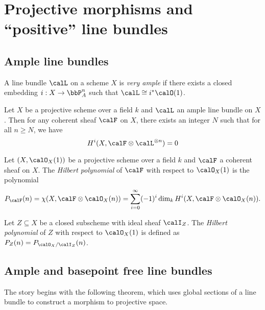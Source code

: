 \section{Projective morphisms and ``positive'' line bundles}


\subsection{Ample line bundles}

    \begin{definition}\label{def:very_ample_line_bundle}
        A line bundle \(\calL\) on a scheme \(X\) is \emph{very ample} if there exists a closed embedding \(i:X\to \bbP^n_A\) such that \(\calL\cong i^*\calO(1)\).
    \end{definition}

    \begin{theorem}\label{thm:Serre_vanishing}
        Let \(X\) be a projective scheme over a field \(k\) and \(\calL\) an ample line bundle on \(X\). 
        Then for any coherent sheaf \(\calF\) on \(X\), there exists an integer \(N\) such that for all \(n \geq N\), we have
        \[ H^i(X, \calF \otimes \calL^{\otimes n}) = 0 \]
    \end{theorem}

    \begin{definition}\label{def:Hilbert_polynomial_w.r.t_ample_line_bundles}
        Let \((X,\calO_X(1))\) be a projective scheme over a field \(k\) and \(\calF\) a coherent sheaf on \(X\).
        The \emph{Hilbert polynomial} of \(\calF\) with respect to \(\calO_X(1)\) is the polynomial 
        \[
            P_{\calF}(n) = \chi(X, \calF \otimes \calO_X(n)) = \sum_{i=0}^{\infty} (-1)^i \dim_k H^i(X, \calF \otimes \calO_X(n)).
        \]

        Let \(Z \subseteq X\) be a closed subscheme with ideal sheaf \(\calI_Z\).
        The \emph{Hilbert polynomial} of \(Z\) with respect to \(\calO_X(1)\) is defined as \(P_Z(n) = P_{\calO_X/\calI_Z}(n)\).
    \end{definition}

\subsection{Ample and basepoint free line bundles}

    The story begins with the following theorem, which uses global sections of a line bundle to construct a morphism to projective space.

